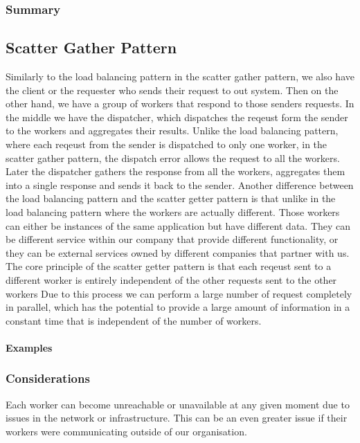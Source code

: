 \subsubsection{Summary}

\subsection{Scatter Gather Pattern}

Similarly to the load balancing pattern in the scatter gather pattern, we also have the client or the requester who sends their request to out system.
Then on the other hand, we have a group of workers that respond to those senders requests.
In the middle we have the dispatcher, which dispatches the reqeust form the sender to the workers and aggregates their results.
Unlike the load balancing pattern, where each reqeust from the sender is dispatched to only one worker, in the scatter gather pattern, the dispatch error allows the request to all the workers.
Later the dispatcher gathers the response from all the workers, aggregates them into a single response and sends it back to the sender.
Another difference between the load balancing pattern and the scatter getter pattern is that unlike in the load balancing pattern where the workers are actually different.
Those workers can either be instances of the same application but have different data.
They can be different service within our company that provide different functionality, or they can be external services owned by different companies that partner with us.
The core principle of the scatter getter pattern is that each reqeust sent to a different worker is entirely independent of the other requests sent to the other workers
Due to this process we can perform a large number of request completely in parallel, which has the potential to provide a large amount of information in a constant time that is independent of the number of workers.

\paragraph{Examples}

\subsubsection{Considerations}

Each worker can become unreachable or unavailable at any given moment due to issues in the network or infrastructure.
This can be an even greater issue if their workers were communicating outside of our organisation.

